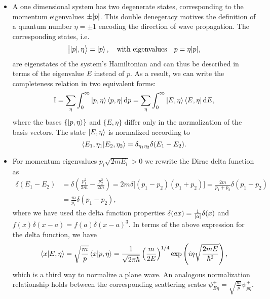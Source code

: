 \documentclass[11pt, a4paper]{article}
\newcommand{\diff}{\mathop{}\!\mathrm{d}} %
\newcommand{\II}{\operatorname{I}}  %
\newcommand{\bket}[1]{\big | {#1} \big \rangle }
\begin{document}
\begin{itemize}
    \item A one dimensional system has two degenerate states, corresponding to the momentum eigenvalues $ \pm \abs{p} $. This double denegeracy motives the definition of a quantum number $ \eta = \pm 1$ encoding the direction of wave propagation. The corresponding states, i.e.
    \begin{equation*}
        \bket{\abs{p}, \eta} = \ket{p}, \quad \text{with eigenvalues} \quad p = \eta \abs{p},
    \end{equation*}
    are eigenstates of the system's Hamiltonian and can thus be described in terms of the eigenvalue $ E $ instead of $ p $. As a result, we can write the completeness relation in two equivalent forms:
    \begin{equation*}
        \II = \sum_{\eta} \int_{0}^{\infty} \ket{p, \eta} \bra{p, \eta} \diff p = \sum_{\eta} \int_{0}^{\infty} \ket{E, \eta} \bra{E, \eta} \diff E,
    \end{equation*}
    where the bases $ \{\ket{p, \eta}\} $ and $ \{E, \eta\} $ differ only in the normalization of the basis vectors. The state $ \ket{E, \eta} $ is normalized according to
    \begin{equation*}
        \braket{E_{1}, \eta_{1}}{E_{2}, \eta_{2}} = \delta_{\eta_{1}\eta_{2}}\delta(E_{1} -E_{2}).
    \end{equation*}

    \item For momentum eigenvalues $ p_{i} \sqrt{2mE_{i}} > 0 $ we rewrite the Dirac delta function as
    \begin{align*}
        \delta(E_{1} - E_{2}) &= \delta \left( \frac{p_{1}^{2}}{2m} - \frac{p_{2}^{2}}{2m} \right) = 2m \delta \big[ (p_{1} - p_{2})(p_{1} + p_{2}) \big] = \frac{2m}{p_{1} + p_{2}}\delta(p_{1} - p_{2})\\
        & = \frac{m}{p_{1}} \delta(p_{1} - p_{2}),
    \end{align*}
    where we have used the delta function properties $ \delta(ax) = \frac{1}{\abs{a}}\delta(x) $ and $ f(x)\delta(x-a) = f(a)\delta(x-a)^{3} $. In terms of the above expression for the delta function, we have
    \begin{equation*}
        \braket{x}{E, \eta} = \sqrt{\frac{m}{p}} \braket{x}{p, \eta} = \frac{1}{\sqrt{2\pi \hbar}} \left( \frac{m}{2E} \right)^{1/4} \exp \left( i\eta \sqrt{\frac{2m E}{\hbar^{2}}} \right),
    \end{equation*}
    which is a third way to normalize a plane wave. An analogous normalization relationship holds between the corresponding scattering scates $ \psi_{E\eta}^{+} = \sqrt{\frac{m}{p}} \psi_{p\eta}^{+} $.

\end{itemize}
\end{document}
